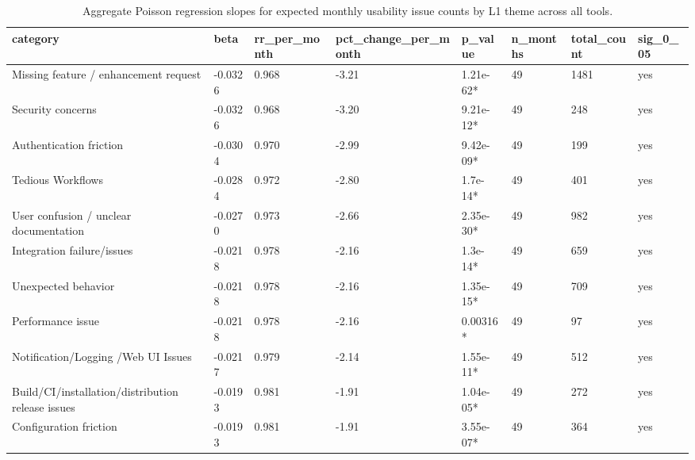 \begin{table}[t]
\centering
\caption{Aggregate Poisson regression slopes for expected monthly usability issue counts by L1 theme across all tools.}
\label{tab:poisson-aggregate-l1-theme}
\scriptsize
\begin{tabular}{llllllll}
\hline
category & beta & rr\_per\_month & pct\_change\_per\_month & p\_value & n\_months & total\_count & sig\_0\_05 \\
\hline
Missing feature / enhancement request & -0.0326 & 0.968 & -3.21 & 1.21e-62* & 49 & 1481 & yes \\
Security concerns & -0.0326 & 0.968 & -3.20 & 9.21e-12* & 49 & 248 & yes \\
Authentication friction & -0.0304 & 0.970 & -2.99 & 9.42e-09* & 49 & 199 & yes \\
Tedious Workflows & -0.0284 & 0.972 & -2.80 & 1.7e-14* & 49 & 401 & yes \\
User confusion / unclear documentation & -0.0270 & 0.973 & -2.66 & 2.35e-30* & 49 & 982 & yes \\
Integration failure/issues & -0.0218 & 0.978 & -2.16 & 1.3e-14* & 49 & 659 & yes \\
Unexpected behavior & -0.0218 & 0.978 & -2.16 & 1.35e-15* & 49 & 709 & yes \\
Performance issue & -0.0218 & 0.978 & -2.16 & 0.00316* & 49 & 97 & yes \\
Notification/Logging /Web UI Issues & -0.0217 & 0.979 & -2.14 & 1.55e-11* & 49 & 512 & yes \\
Build/CI/installation/distribution release issues & -0.0193 & 0.981 & -1.91 & 1.04e-05* & 49 & 272 & yes \\
Configuration friction & -0.0193 & 0.981 & -1.91 & 3.55e-07* & 49 & 364 & yes \\
\hline
\end{tabular}
\end{table}
